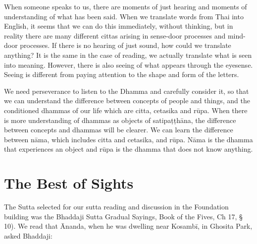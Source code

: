 When someone speaks to us, there are moments of just hearing and moments of understanding of what has been said. When we translate words from Thai into English, it seems that we can do this immediately, without thinking, but in reality there are many different cittas arising in sense-door processes and mind-door processes. If there is no hearing of just sound, how could we translate anything?
It is the same in the case of reading, we actually translate what is seen into meaning. However, there is also seeing of what appears through the eyesense. Seeing is different from paying attention to the shape and form of the letters.

We need perseverance to listen to the Dhamma and carefully consider it, so that we can understand the difference between concepts of people and things, and the conditioned dhammas of our life which are citta, cetasika and rūpa. When there is more understanding of dhammas as objects of satipaṭṭhāna, the difference between concepts and dhammas will be clearer. We can learn the difference between nāma, which includes citta and cetasika, and rūpa. Nāma is the dhamma that experiences an object and rūpa is the dhamma that does not know anything.


\chapter{The Best of Sights}

The Sutta selected for our sutta reading and discussion in the Foundation building was the Bhaddaji Sutta Gradual Sayings, Book of the Fives, Ch 17, § 10). We read that Ānanda, when he was dwelling near Kosambī, in Ghosita Park, asked Bhaddaji:

